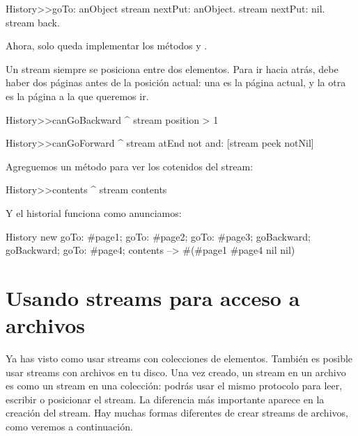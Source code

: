 \documentclass[a4paper,10pt,twoside]{book}
\begin{document}
{\begin{code}{}
History>>goTo: anObject
  stream nextPut: anObject.
  stream nextPut: nil.
  stream back.
\end{code}

Ahora, solo queda implementar los m\'etodos  y .

Un stream siempre se posiciona entre dos elementos. Para ir hacia atr\'as,
debe haber dos p\'aginas antes de la posici\'on actual: una es la p\'agina actual,
y la otra es la p\'agina a la que queremos ir. 

\begin{code}{}
History>>canGoBackward
  ^ stream position > 1

History>>canGoForward
  ^ stream atEnd not and: [stream peek notNil]
\end{code}

Agreguemos un m\'etodo para ver los cotenidos del stream:
\begin{code}{}
History>>contents
  ^ stream contents
\end{code}

Y el historial funciona como anunciamos:
\begin{code}{}
History new
	goTo: #page1;
	goTo: #page2;
	goTo: #page3;
	goBackward;
	goBackward;
	goTo: #page4;
	contents --> #(#page1 #page4 nil nil)
\end{code}

\section{Usando streams para acceso a archivos}

Ya has visto como usar streams con colecciones de elementos. Tambi\'en es posible
usar streams con archivos en tu disco. 
Una vez creado, un stream en un archivo es como un stream en una colecci\'on:
podr\'as usar el mismo protocolo para leer, escribir o posicionar el stream.
La diferencia m\'as importante aparece en la creaci\'on del stream.
Hay muchas formas diferentes de crear streams de archivos, como veremos a continuaci\'on.
 
}
\end{document}
